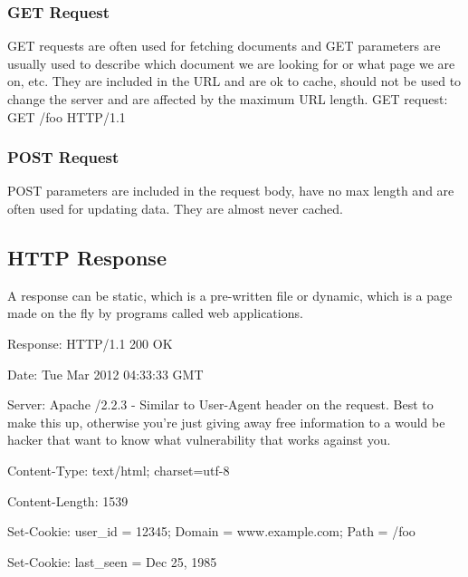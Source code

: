 \documentclass[12pt]{article}
\begin{document}
\subsubsection{GET Request}

GET requests are often used for fetching documents and GET parameters are usually used to describe which document we are looking for or what page we are on, etc. They are included in the URL and are ok to cache, should not be used to change the server and are affected by the maximum URL length.
GET request: GET /foo HTTP/1.1

\subsubsection{POST Request}

POST parameters are included in the request body, have no max length and are often used for updating data. They are almost never cached.

\subsection{HTTP Response}
A response can be static, which is a pre-written file or dynamic, which is a page made on the fly by programs called web applications.

\begin{list}{*}{
\setlength{\itemsep}{0pt}
\setlength{\parsep}{0pt}
\setlength{\topsep}{0pt}
\setlength{\partopsep}{0pt}
\setlength{\leftmargin}{2em}
\setlength{\labelwidth}{1.5em}
\setlength{\labelsep}{0.5em}
}
\item Response: HTTP/1.1 200 OK
\item Date: Tue Mar 2012 04:33:33 GMT
\item Server: Apache /2.2.3 - Similar to User-Agent header on the request. Best to make this up, otherwise you're just giving away free information to a would be hacker that want to know what vulnerability that works against you.
\item Content-Type: text/html; charset=utf-8
\item Content-Length: 1539
\item Set-Cookie: user\_id = 12345; Domain = www.example.com; Path = /foo
\item Set-Cookie: last\_seen = Dec 25, 1985
\end{list}
\end{document}

